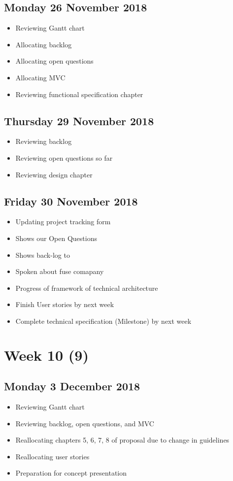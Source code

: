 \subsection*{Monday 26 November 2018}
\begin{itemize}
	\item Reviewing Gantt chart
	\item Allocating backlog
	\item Allocating open questions
	\item Allocating MVC
	\item Reviewing functional specification chapter
\end{itemize}

\subsection*{Thursday 29 November 2018}
\begin{itemize}
	\item Reviewing backlog
	\item Reviewing open questions so far
	\item Reviewing design chapter
\end{itemize}

\subsection*{Friday 30 November 2018}
\begin{itemize}
	\item Updating project tracking form
	\item Shows our Open Questions
	\item Shows back-log to
	\item Spoken about fuse comapany
	\item Progress of framework of technical architecture
	\item Finish User stories by next week
	\item Complete technical specification (Milestone) by next week
\end{itemize}

\section*{Week 10 (9)}
\subsection*{Monday 3 December 2018}
\begin{itemize}
	\item Reviewing Gantt chart
	\item Reviewing backlog, open questions, and MVC
	\item Reallocating chapters 5, 6, 7, 8 of proposal due to change in guidelines
	\item Reallocating user stories
	\item Preparation for concept presentation
\end{itemize}

